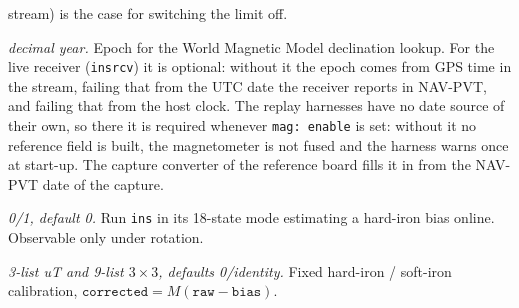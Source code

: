 \documentclass[11pt,a4paper]{article}
\newcommand{\code}[1]{\texttt{#1}}
\begin{document}
\begin{description}
    stream) is the case for switching the limit off.
  \item[\code{mag: wmm\_\allowbreak{}year}] \emph{decimal year.} Epoch for the World Magnetic
    Model declination lookup. For the live receiver (\code{insrcv}) it is
    optional: without it the epoch comes from GPS time in the stream,
    failing that from the UTC date the receiver reports in NAV-PVT, and
    failing that from the host clock. The replay harnesses have no date
    source of their own, so there it is required whenever \code{mag: enable}
    is set: without it no reference field is built, the magnetometer is
    not fused and the harness warns once at start-up.
    The capture converter of the reference board fills it in
    from the NAV-PVT date of the capture.
  \item[\code{mag: estimate\_\allowbreak{}bias}] \emph{0/1, default 0.} Run \code{ins} in its
    18-state mode estimating a hard-iron bias online.
    Observable only under rotation.
  \item[\code{mag: fixed\_\allowbreak{}bias}, \code{mag: misalignment}] \emph{3-list uT and
    9-list $3\times3$, defaults 0/identity.} Fixed hard-iron / soft-iron
    calibration, $\code{corrected}=M(\code{raw}-\code{bias})$.


\end{description}
\end{document}
